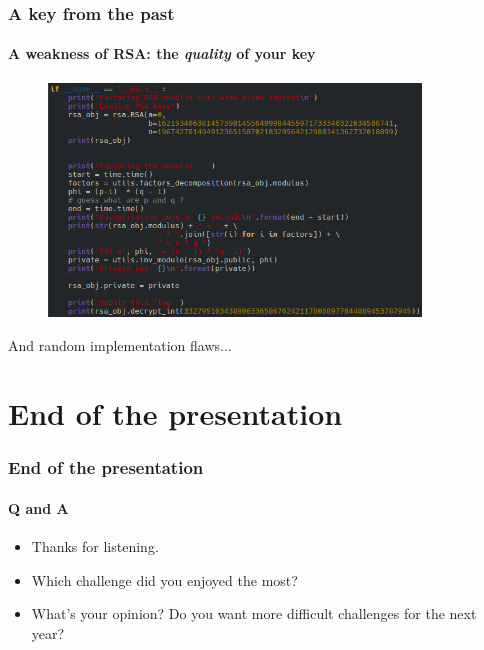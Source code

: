 \documentclass[]{beamer}
\begin{document}
\begin{frame}
\frametitle{A key from the past}
\framesubtitle{A weakness of RSA: the \textit{quality} of your key}
\begin{center}
\includegraphics[height=6.2cm, width=12.0cm]{./images/RSA-weak-prime-factors.png}
\end{center}
And random implementation flaws...
\end{frame}







%
%
\section*{End of the presentation}
\begin{frame}
    \frametitle{End of the presentation}
    \framesubtitle{Q and A}
    \begin{center}
        \begin{itemize}
            \item Thanks for listening.
            \item Which challenge did you enjoyed the most?
            \item What's your opinion? Do you want more difficult challenges for the next year?
        \end{itemize}
    \end{center}
\end{frame}
\end{document}
